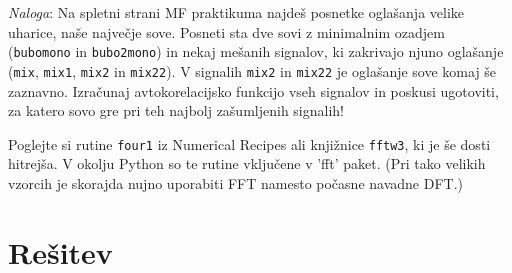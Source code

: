 \documentclass{article}
\begin{document}
\bigskip

{\it Naloga\/}: Na spletni strani MF praktikuma najdeš posnetke
oglašanja velike uharice, naše največje sove.  Posneti sta
dve sovi z minimalnim ozadjem ({\tt bubomono} in {\tt bubo2mono})
in nekaj mešanih signalov, ki zakrivajo njuno oglašanje
({\tt mix}, {\tt mix1}, {\tt mix2} in {\tt mix22}).
V signalih {\tt mix2} in {\tt mix22} je oglašanje sove
komaj še zaznavno.  Izračunaj avtokorelacijsko funkcijo 
vseh signalov in poskusi ugotoviti, za katero sovo gre
pri teh najbolj zašumljenih signalih!

Poglejte si rutine {\tt four1\/} iz Numerical Recipes
ali knjižnice {\tt fftw3}, ki je še dosti hitrejša. V okolju Python
so te rutine vključene v 'fft' paket. 
(Pri tako velikih vzorcih je skorajda nujno uporabiti FFT
namesto počasne navadne DFT.)
\section{Rešitev}
\end{document}

